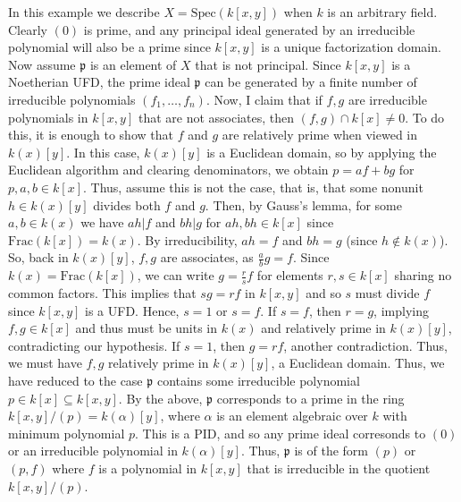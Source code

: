 \begin{example}
\label{example-spec-kxy}
In this example we describe $X = \text{Spec}(k[x, y])$
when $k$ is an arbitrary field.
Clearly $(0)$ is prime, and any principal ideal generated by an
irreducible polynomial will also be a prime since $k[x, y]$ is a
unique factorization domain. Now assume $\mathfrak p$ is an
element of $X$ that is not principal. Since $k[x, y]$ is a
Noetherian UFD, the prime ideal $\mathfrak p$ can be generated
by a finite number of irreducible polynomials $(f_1, \ldots, f_n)$.
Now, I claim that if $f, g$ are irreducible polynomials in $k[x, y]$
that are not associates, then $(f, g) \cap k[x] \neq 0$. To do this,
it is enough to show that $f$ and $g$ are relatively prime when
viewed in $k(x)[y]$. In this case, $k(x)[y]$ is a Euclidean domain,
so by applying the Euclidean algorithm and clearing denominators, we
obtain $p = af + bg$ for $p, a, b \in k[x]$. Thus, assume this is not
the case, that is, that some nonunit $h \in k(x)[y]$ divides both
$f$ and $g$. Then, by Gauss's lemma, for some $a, b \in k(x)$ we
have $ah | f$ and $bh | g$ for $ah, bh \in k[x]$ since
$\textrm{Frac}(k[x]) = k(x)$. By irreducibility, $ah = f$ and
$bh = g$ (since $h \notin k(x)$). So, back in $k(x)[y]$, $f, g $
are associates, as $\frac{a}{b} g = f$. Since
$k(x) = \textrm{Frac}(k[x])$, we can write $g = \frac{r}{s} f $
for elements $r , s \in k[x]$ sharing no common factors. This
implies that $sg = rf$ in $k[x, y]$ and so $s$ must divide $f$
since $k[x, y]$ is a UFD. Hence, $s = 1$ or $s = f$. If $s = f$,
then $r = g$, implying $f, g \in k[x]$ and thus must be units in
$k(x)$ and relatively prime in $k(x)[y]$, contradicting our
hypothesis. If $s = 1$, then $g = rf$, another contradiction.
Thus, we must have $f, g$ relatively prime in $k(x)[y]$, a
Euclidean domain. Thus, we have reduced to the case $\mathfrak p$
contains some irreducible polynomial $p \in k[x] \subseteq k[x, y]$.
By the above, $\mathfrak p$ corresponds to a prime in the ring
$k[x, y]/(p) = k(\alpha)[y]$, where $\alpha$ is an element
algebraic over $k$ with minimum polynomial $p$. This is a
PID, and so any prime ideal corresonds to $(0)$ or an
irreducible polynomial in $k(\alpha)[y]$. Thus, $\mathfrak p$
is of the form $(p)$ or $(p, f)$ where $f$ is a
polynomial in $k[x, y]$ that is irreducible in the quotient
$k[x, y]/(p)$.
\end{example}

